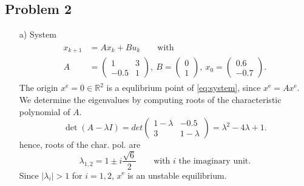 \documentclass[]{article}
\newcommand{\xk}{x_k}
\newcommand{\uk}{u_k}
\newcommand{\xnull}{x_0}
\newcommand{\xeq}{x^{\mathrm{e}}}
\newcommand{\matricks}[4]{\begin{pmatrix}#1 & #2 \\ #3 & #4 \end{pmatrix}}
\newcommand{\xkplus}{x_{k+1}}
\newcommand{\vectortwo}[2]{\begin{pmatrix}
		#1 \\ #2
\end{pmatrix}}
\newcommand{\R}{\mathbb{R}}
\begin{document}
\subsection*{Problem 2}
		\begin{enumerate}
			\item[a)] System
					\begin{align}
					\begin{split} \label{eq:system}
						\xkplus &= A \xk + B \uk \qquad \text{with}\\
						A &= \matricks{1}{3}{-0.5}{1}, \ B = \vectortwo{0}{1},\ \xnull = \vectortwo{0.6}{-0.7}.
					\end{split}
					\end{align}
					The origin $ \xeq = 0 \in \R^2 $ is a equlibrium point of \eqref{eq:system}, since $ \xeq = A \xeq. $
					We determine the eigenvalues by computing roots of the characteristic polynomial of $ A $.
					\[ \det(A - \lambda I) = det\matricks{1-\lambda}{-0.5}{3}{1-\lambda} = \lambda^2 -4\lambda + 1. \]
					hence, roots of the char. pol. are
					\[ \lambda_{1,2} = 1 \pm i \frac{\sqrt{6}}{2} \qquad \text{with }i\text{ the imaginary unit.}\]
					Since $ |\lambda_i | > 1  $ for $ i=1,2 $, $ \xeq $ is an unstable equilibrium.
					

\end{enumerate}
\end{document}

